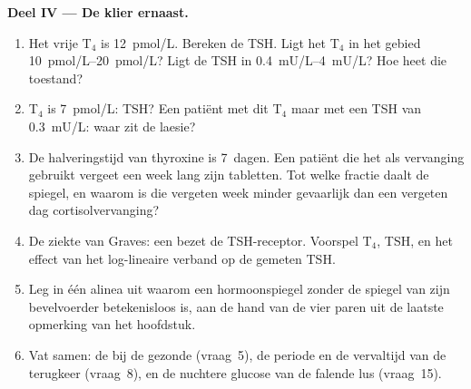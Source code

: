 \begin{problem}
\medskip
\noindent\textbf{Deel IV --- De klier ernaast.}
\begin{enumerate}[resume]
  \item Het vrije T$_{4}$ is \qty{12}{pmol/L}. Bereken de TSH. Ligt het
        T$_{4}$ in het gebied \qtyrange{10}{20}{pmol/L}? Ligt de TSH in
        \qtyrange{0.4}{4}{mU/L}? Hoe heet die toestand?
  \item T$_{4}$ is \qty{7}{pmol/L}: TSH? Een patiënt met dit T$_{4}$
        maar met een TSH van \qty{0.3}{mU/L}: waar zit de laesie?
  \item De halveringstijd van thyroxine is \qty{7}{dagen}. Een patiënt
        die het als vervanging gebruikt vergeet een week lang zijn
        tabletten. Tot welke fractie daalt de spiegel, en waarom is die
        vergeten week minder gevaarlijk dan een vergeten dag
        cortisolvervanging?
  \item De ziekte van Graves: een  bezet de TSH-receptor.
        Voorspel T$_{4}$, TSH, en het effect van het log-lineaire
        verband op de gemeten TSH.
  \item Leg in één alinea uit waarom een hormoonspiegel zonder de
        spiegel van zijn bevelvoerder betekenisloos is, aan de hand van
        de vier paren uit de laatste opmerking van het hoofdstuk.
  \item Vat samen: de  bij de gezonde (vraag~5), de
        periode en de vervaltijd van de terugkeer (vraag~8), en de
        nuchtere glucose van de falende lus (vraag~15).
\end{enumerate}
\end{problem}

